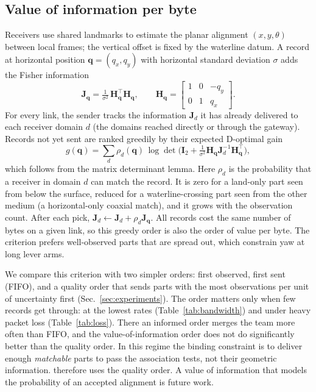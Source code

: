 \subsection{Value of information per byte}
Receivers use shared landmarks to estimate the planar alignment $(x, y, \theta)$ between local
frames; the vertical offset is fixed by the waterline datum. A record at horizontal position
$\mathbf{q} = (q_x, q_y)$ with horizontal standard deviation $\sigma$ adds the Fisher information
\begin{equation}
  \mathbf{J}_{\mathbf{q}} = \tfrac{1}{\sigma^2}\,\mathbf{H}_{\mathbf{q}}^{\!\top}\mathbf{H}_{\mathbf{q}},
  \qquad
  \mathbf{H}_{\mathbf{q}} = \begin{bmatrix} 1 & 0 & -q_y \\ 0 & 1 & q_x \end{bmatrix}.
\end{equation}
For every link, the sender tracks the information $\mathbf{J}_d$ it has already delivered to each
receiver domain $d$ (the domains reached directly or through the gateway). Records not yet sent
are ranked greedily by their expected D-optimal gain
\begin{equation}
  g(\mathbf{q}) = \sum_{d} \rho_d(\mathbf{q})\,
  \log\det\!\Big(\mathbf{I}_2 + \tfrac{1}{\sigma^2}\mathbf{H}_{\mathbf{q}}\mathbf{J}_d^{-1}\mathbf{H}_{\mathbf{q}}^{\!\top}\Big),
\end{equation}
which follows from the matrix determinant lemma. Here $\rho_d$ is the probability that a receiver in domain $d$ can match
the record. It is zero for a land-only part seen from below the surface, reduced for a
waterline-crossing part seen from the other medium (a horizontal-only coaxial match), and it
grows with the observation count. After each pick, $\mathbf{J}_d \leftarrow \mathbf{J}_d + \rho_d\mathbf{J}_{\mathbf{q}}$.
All records cost the same number of bytes on a given link, so this greedy order is also the order of value per
byte. The criterion prefers well-observed parts that are spread out, which constrain yaw
at long lever arms.

We compare this criterion with two simpler orders: first observed, first sent (FIFO), and a
quality order that sends parts with the most observations per unit of uncertainty first
(Sec.~\ref{sec:experiments}). The order matters only when few records get through: at the
lowest rates (Table~\ref{tab:bandwidth}) and under heavy packet loss (Table~\ref{tab:loss}).
There an informed order merges the team more often than FIFO, and the value-of-information
order does not do significantly better than the quality order. In this regime the binding constraint is to
deliver enough \emph{matchable} parts to pass the association tests, not their geometric
information. \avatar{} therefore uses the quality order. A value of information that models the
probability of an accepted alignment is future work.


